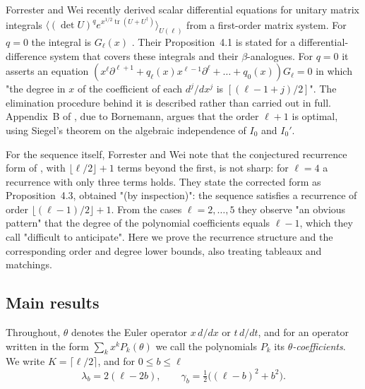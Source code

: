\documentclass[11pt,a4paper]{article}
\theoremstyle{definition}
\theoremstyle{remark}
\newcommand{\fl}[1]{\lfloor #1\rfloor}
\newcommand{\cl}[1]{\lceil #1\rceil}
\DeclareMathOperator{\tr}{tr}
\numberwithin{equation}{section}
\begin{document}
Forrester and Wei \cite{FW26} recently derived scalar differential equations for unitary matrix integrals $\langle(\det U)^q e^{x^{1/2}\tr(U+U^\dagger)}\rangle_{U(\ell)}$ from a first-order matrix system. For $q=0$ the integral is $G_\ell(x)$ \cite[(4.6)]{FW26}. Their Proposition~4.1 is stated for a differential-difference system that covers these integrals and their $\beta$-analogues. For $q=0$ it asserts an equation $(x^\ell\partial^{\ell+1}+q_\ell(x)x^{\ell-1}\partial^\ell+\dots+q_0(x))G_\ell=0$ in which "the degree in $x$ of the coefficient of each $d^j/dx^j$ is $[(\ell-1+j)/2]$". The elimination procedure behind it is described rather than carried out in full. Appendix~B of \cite{FW26}, due to Bornemann, argues that the order $\ell+1$ is optimal, using Siegel's theorem on the algebraic independence of $I_0$ and $I_0'$.

For the sequence itself, Forrester and Wei note that the conjectured recurrence form of \cite{BFK95}, with $\fl{\ell/2}+1$ terms beyond the first, is not sharp: for $\ell=4$ a recurrence with only three terms holds. They state the corrected form as Proposition~4.3, obtained "(by inspection)": the sequence satisfies a recurrence of order $\fl{(\ell-1)/2}+1$. From the cases $\ell=2,\dots,5$ they observe "an obvious pattern" that the degree of the polynomial coefficients equals $\ell-1$, which they call "difficult to anticipate". Here we prove the recurrence structure and the corresponding order and degree lower bounds, also treating tableaux and matchings.

\subsection{Main results}
Throughout, $\theta$ denotes the Euler operator $x\,d/dx$ or $t\,d/dt$, and for an operator written in the form $\sum_k x^kP_k(\theta)$ we call the polynomials $P_k$ its \emph{$\theta$-coefficients}. We write $K=\cl{\ell/2}$, and for $0\le b\le \ell$
\begin{equation}\label{B:eq:gamma}
\lambda_b=2(\ell-2b),\qquad \gamma_b=\tfrac12\bigl((\ell-b)^2+b^2\bigr).
\end{equation}
\end{document}
